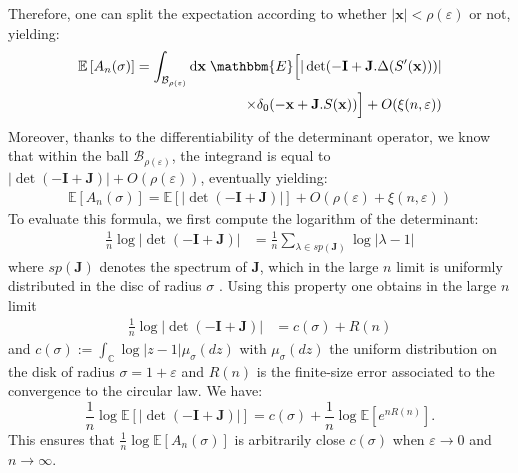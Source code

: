 Therefore, one can split the expectation according to whether $|{\mathbf{x}}|<\rho(\varepsilon)$ or not, yielding:
\begin{align*}
	{\mathbb{E}\left [ {A_n(\sigma)} \right]} =\int_{\mathcal{B}_{\rho(\varepsilon)}} \textrm{d}{\mathbf{x}}\;\mathbbm{E}\Big[ |\det (-{\mathbf{I}} + {\mathbf{J}}.\Delta (S'({\mathbf{x}})))| \\
	\times \delta_0(-{\mathbf{x}}+{\mathbf{J}}.S({\mathbf{x}}))\Big] + O(\xi(n,\varepsilon))
\end{align*}
Moreover, thanks to the differentiability of the determinant operator, we know that within the ball $\mathcal{B}_{\rho(\varepsilon)}$, the integrand is equal to $|\det (-{\mathbf{I}} + {\mathbf{J}})| + O(\rho(\varepsilon))$, eventually yielding:
\begin{align*}
	{\mathbb{E}\left [ {A_n(\sigma)} \right]} ={\mathbb{E}\left [ {|\det (-{\mathbf{I}} + {\mathbf{J}})|} \right]} + O(\rho(\varepsilon)+\xi(n,\varepsilon))
\end{align*}
To evaluate this formula, we first compute the logarithm of the determinant:
\begin{align*}
	\frac{1}{n} \log |\det (-{\mathbf{I}} + {\mathbf{J}})| &= \frac 1 n \sum_{\lambda \in sp({\mathbf{J}})} \log |\lambda -1|
	\end{align*} 
where $sp({\mathbf{J}})$ denotes the spectrum of ${\mathbf{J}}$, which in the large $n$ limit is uniformly distributed in the disc of radius $\sigma$ \cite{girko:85}. Using this property one obtains in the large $n$ limit
\begin{align*}
	\frac{1}{n} \log |\det (-{\mathbf{I}} + {\mathbf{J}})| &= c(\sigma) + R(n)
	\end{align*}
 and  $c(\sigma):=\int_{\mathbb{C}} \log |z -1| \mu_{\sigma}(dz)$ with $\mu_{\sigma}(dz)$ the uniform distribution on the disk of radius $\sigma=1+\varepsilon$ and $R(n)$ is the finite-size error associated to the convergence to the circular law. We have:
\begin{equation}
	\frac 1 n \log {\mathbb{E}\left [ {|\det(-{\mathbf{I}}+{\mathbf{J}})|} \right]} = c(\sigma) + \frac 1 n \log {\mathbb{E}\left [ {e^{nR(n)}} \right]}.
\end{equation}
This ensures that $\frac 1 n \log {\mathbb{E}\left [ {A_n(\sigma)} \right]}$ is arbitrarily close $c(\sigma)$ when $\varepsilon \to 0$ and $n\to\infty$. 

